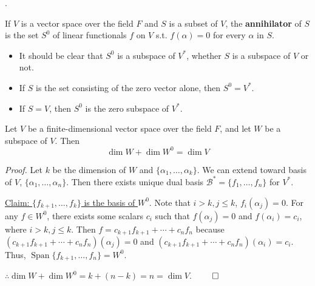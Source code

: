 \documentclass[8pt]{beamer}
\newcommand{\mc}[1]{\mathcal{#1}}
\newcommand{\tb}[1]{\textbf{#1}}
\newcommand{\ti}[1]{\textit{#1}}
\newcommand{\Span}{\operatorname{Span}}
\begin{document}
\begin{frame}{.}
    \begin{definition}
        If $V$ is a vector space over the field $F$ and $S$ is a subset of $V$, the \tb{annihilator} of $S$ is the set $S^0$ of linear functionals $f$ on $V$ s.t. $f(\alpha) = 0$ for every $\alpha$ in $S$.
    \end{definition}
    \begin{itemize}
        \item It should be clear that $S^0$ is a subspace of $V^\ast$, whether $S$ is a subspace of $V$ or not.
        \item If $S$ is the set consisting of the zero vector alone, then $S^0 = V^\ast$.
        \item If $S =V$, then $S^0$ is the zero subspace of $V^\ast$.
    \end{itemize}

    \begin{theorem} \label{th:6}
        Let $V$ be a finite-dimensional vector space over the field $F$, and let $W$ be a subspace of $V$.
        Then
        \[
            \dim W + \dim W^0 = \dim V
        \]
    \end{theorem}

    \ti{Proof.}
    Let $k$ be the dimension of $W$ and $\{\alpha_1, \dots, \alpha_k\}$.
    We can extend toward basis of $V$, $\{\alpha_1, \dots, \alpha_n\}$.
    Then there exists unique dual basis $\mc{B}^\ast = \{f_1, \dots, f_n\}$ for $V^\ast$.

    \underline{Claim: $\{f_{k+1}, \dots, f_k\}$ is the basis of $W^0$}.
    Note that $i>k, j \leq k$, $f_{i}(\alpha_j) = 0$.
    For any $f \in W^0$, there exists some scalars $c_i$ such that $f(\alpha_j) = 0$ and $f(\alpha_i) = c_i$, where $i >k, j \leq k$.
    Then $f = c_{k+1} f_{k+1} + \cdots + c_n f_{n}$ because $(c_{k+1} f_{k+1} + \cdots +c_n f_n)(\alpha_j) = 0$ and $(c_{k+1} f_{k+1} + \cdots + c_n f_n)(\alpha_i) = c_i$.
    Thus, $\Span \{f_{k+1}, \dots, f_n\} = W^0$.

    $\therefore \dim W + \dim W^0 = k + (n-k) = n = \dim V$.
    $\qed$
\end{frame}
\end{document}
